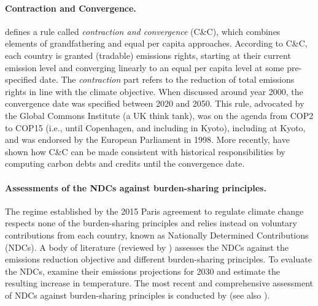 \paragraph{Contraction and Convergence.} \citet{meyer_briefing_2004} defines a rule called \textit{contraction and convergence} (C\&C), which combines elements of grandfathering and equal per capita approaches. According to C\&C, each country is granted (tradable) emissions rights, starting at their current emission level and converging linearly to an equal per capita level at some pre-specified date. The \textit{contraction} part refers to the reduction of total emissions rights in line with the climate objective. When discussed around year 2000, the convergence date was specified between 2020 and 2050. This rule, advocated by the Global Commons Institute (a UK think tank), was on the agenda from COP2 to COP15 (i.e., until Copenhagen, and including in Kyoto), including at Kyoto, and was endorsed by the European Parliament in 1998. More recently, \citet{gignac_allocating_2015} have shown how C\&C can be made consistent with historical responsibilities by computing carbon debts and credits until the convergence date.


\paragraph{Assessments of the NDCs against burden-sharing principles.} 
The regime established by the 2015 Paris agreement to regulate climate change respects none of the burden-sharing principles and relies instead on voluntary contributions from each country, known as Nationally Determined Contributions (NDCs). A body of literature (reviewed by \citealp{hohne_regional_2014}) assesses the NDCs against the emissions reduction objective and different burden-sharing principles. To evaluate the NDCs, \citet{gao_sufficient_2019} examine their emissions projections for 2030 and estimate the resulting increase in temperature. The most recent and comprehensive assessment of NDCs against burden-sharing principles is conducted by \citet{van_den_berg_implications_2020} (see also \citealp{robiou_du_pont_national_2016,robiou_du_pont_equitable_2017,raupach_sharing_2014}). 

